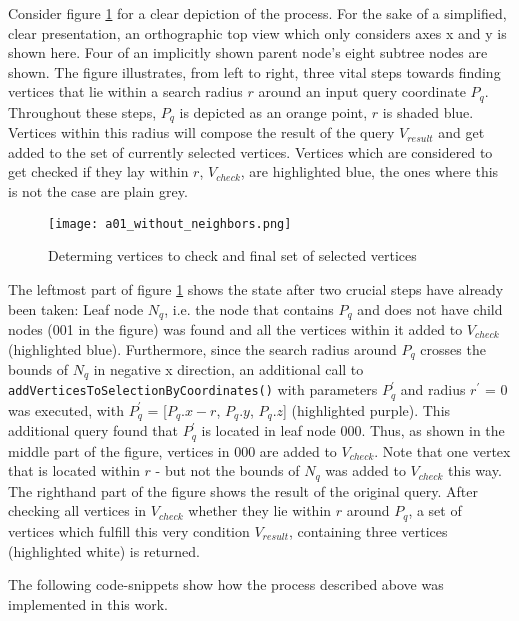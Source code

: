 Consider figure \ref{fig:a01_without_neighbours} for a clear depiction of the process. For the sake of a simplified, clear presentation, an orthographic top view which only considers axes x and y is shown here. Four of an implicitly shown parent node's eight subtree nodes are shown. The figure illustrates, from left to right, three vital steps towards finding vertices that lie within a search radius $r$ around an input query coordinate $P_q$. Throughout these steps, $P_q$ is depicted as an orange point, $r$ is shaded blue. Vertices within this radius will compose the result of the query $V_{result}$ and get added to the set of currently selected vertices. Vertices which are considered to get checked if they lay within $r$, $V_{check}$, are highlighted blue, the ones where this is not the case are plain grey.

\begin{figure}[htb]
  \centering
  \texttt{[image: a01\_without\_neighbors.png]}
  \caption{Determing vertices to check and final set of selected vertices}\label{fig:a01_without_neighbours}
\end{figure}

The leftmost part of figure \ref{fig:a01_without_neighbours} shows the state after two crucial steps have already been taken: Leaf node $N_q$, i.e. the node that contains $P_q$ and does not have child nodes (001 in the figure) was found and all the vertices within it added to $V_{check}$ (highlighted blue). Furthermore, since the search radius around $P_q$ crosses the bounds of $N_q$ in negative x direction, an additional call to \texttt{addVerticesToSelectionByCoordinates()} with parameters $P_{q}^{'}$ and radius $r^{'}$ = 0 was executed, with $P_{q}^{'}$ = [$P_q.x-r$, $P_q.y$, $P_q.z$] (highlighted purple). This additional query found that $P_{q}^{'}$ is located in leaf node 000. Thus, as shown in the middle part of the figure, vertices in 000 are added to $V_{check}$. Note that one vertex that is located within $r$ - but not the bounds of $N_q$ was added to $V_{check}$ this way. The righthand part of the figure shows the result of the original query. After checking all vertices in $V_{check}$ whether they lie within $r$ around $P_q$, a set of vertices which fulfill this very condition $V_{result}$, containing three vertices (highlighted white) is returned.

The following code-snippets show how the process described above was implemented in this work.

